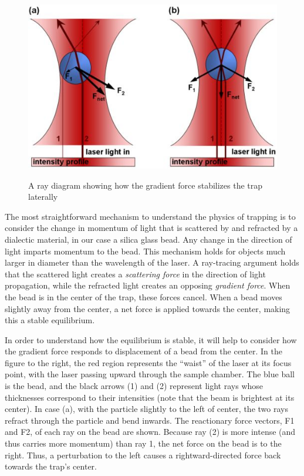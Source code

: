 \documentclass{../lab}
\begin{document}
\begin{figure}[h]
    \centering
    \href{http://experimentationlab.berkeley.edu/sites/default/files/images/500px-Optical_Trap_Ray_Optics_Explanation.jpg}{\includegraphics[width=0.5\linewidth]{images/500px-Optical_Trap_Ray_Optics_Explanation.jpg}}
    \caption{A ray diagram showing how the gradient force stabilizes the trap laterally}
    \label{fig:500px-Optical_Trap_Ray_Optics_Explanation}
\end{figure}

The most straightforward mechanism to understand the physics of trapping is to consider the change in momentum of light that is scattered by and refracted by a dialectic material, in our case a silica glass bead. Any change in the direction of light imparts momentum to the bead. This mechanism holds for objects much larger in diameter than the wavelength of the laser. A ray-tracing argument holds that the scattered light creates a \emph{scattering force} in the direction of light propagation, while the refracted light creates an opposing \emph{gradient force}. When the bead is in the center of the trap, these forces cancel. When a bead moves slightly away from the center, a net force is applied towards the center, making this a stable equilibrium.

In order to understand how the equilibrium is stable, it will help to consider how the gradient force responds to displacement of a bead from the center. In the figure to the right, the red region represents the ``waist'' of the laser at its focus point, with the laser passing upward through the sample chamber. The blue ball is the bead, and the black arrows (1) and (2) represent light rays whose thicknesses correspond to their intensities (note that the beam is brightest at its center). In case (a), with the particle slightly to the left of center, the two rays refract through the particle and bend inwards. The reactionary force vectors, F1 and F2, of each ray on the bead are shown. Because ray (2) is more intense (and thus carries more momentum) than ray 1, the net force on the bead is to the right. Thus, a perturbation to the left causes a rightward-directed force back towards the trap's center.
\end{document}
